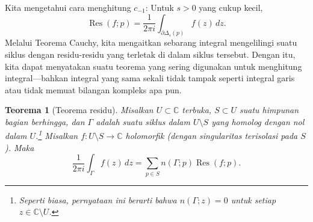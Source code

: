 \documentclass[12pt,openany]{book}
\newcommand{\C}{{\mathbb{C}}}
\theoremstyle{plain}
\newtheorem{thm}{Teorema}[section]
\theoremstyle{remark}
\theoremstyle{definition}
\theoremstyle{exercise}
\theoremstyle{example}
\begin{document}
Kita mengetahui cara menghitung $c_{-1}$: Untuk $s > 0$ yang cukup kecil,
\begin{equation*}
\operatorname{Res}(f;p)
=
\frac{1}{2\pi i} \int_{\partial \Delta_{s}(p)} f(z) \, dz .
\end{equation*}
Melalui Teorema Cauchy, kita mengaitkan sebarang integral mengelilingi
suatu siklus dengan residu-residu yang terletak di dalam siklus tersebut.
Dengan itu, kita dapat menyatakan suatu teorema yang sering digunakan untuk menghitung
integral---bahkan integral yang sama sekali tidak tampak seperti integral garis atau
tidak memuat bilangan kompleks apa pun.

\begin{thm}[Teorema residu]\label{thm:residue}
\pagebreak[2]
Misalkan $U \subset \C$ terbuka, $S \subset U$ suatu himpunan bagian berhingga,
dan $\Gamma$ adalah
suatu siklus
dalam $U \setminus S$
yang homolog dengan nol dalam $U$.\footnote{Seperti biasa, pernyataan ini berarti bahwa
$n(\Gamma;z) = 0$ untuk setiap $z \in \C \setminus U$.}
Misalkan $f \colon U \setminus S \to \C$ holomorfik (dengan singularitas
terisolasi pada $S$).
Maka
\begin{equation*}
\frac{1}{2\pi i} \int_{\Gamma} f(z) \, dz = \sum_{p \in S} n(\Gamma;p) \operatorname{Res}(f;p) .
\end{equation*}
\end{thm}
\end{document}
